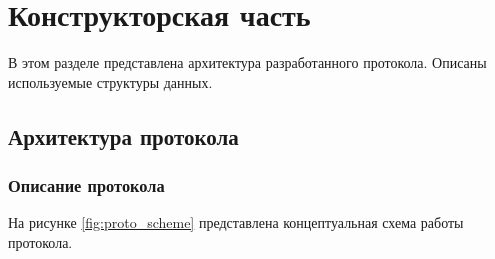 \section{Конструкторская часть}

В этом разделе представлена архитектура разработанного протокола. Описаны используемые структуры данных.

\subsection{Архитектура протокола}

\subsubsection{Описание протокола}

На рисунке \ref{fig:proto_scheme} представлена концептуальная схема работы протокола.

